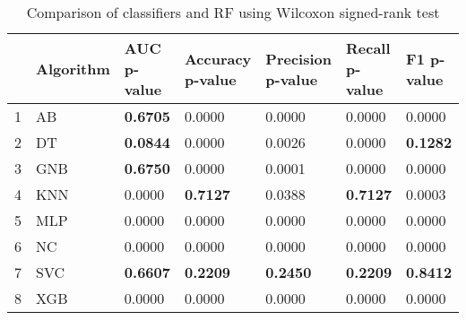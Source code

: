 \begin{table}
\footnotesize
\caption{Comparison of classifiers and RF using Wilcoxon signed-rank test}
\label{tab:wilcoxon comparison}
\begin{tabular}{lllllll}
\hline
 & Algorithm & AUC p-value & Accuracy p-value & Precision p-value & Recall p-value & F1 p-value \\
\hline
1 & AB & \textbf{0.6705} & 0.0000 & 0.0000 & 0.0000 & 0.0000 \\
2 & DT & \textbf{0.0844} & 0.0000 & 0.0026 & 0.0000 & \textbf{0.1282} \\
3 & GNB & \textbf{0.6750} & 0.0000 & 0.0001 & 0.0000 & 0.0000 \\
4 & KNN & 0.0000 & \textbf{0.7127} & 0.0388 & \textbf{0.7127} & 0.0003 \\
5 & MLP & 0.0000 & 0.0000 & 0.0000 & 0.0000 & 0.0000 \\
6 & NC & 0.0000 & 0.0000 & 0.0000 & 0.0000 & 0.0000 \\
7 & SVC & \textbf{0.6607} & \textbf{0.2209} & \textbf{0.2450} & \textbf{0.2209} & \textbf{0.8412} \\
8 & XGB & 0.0000 & 0.0000 & 0.0000 & 0.0000 & 0.0000 \\
\hline
\end{tabular}
\end{table}
